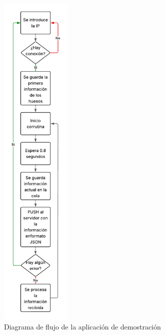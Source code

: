 \begin{figure}[H]
    \centering
    \includegraphics[width=0.3\textwidth]{Imagenes/Vectorial/FlujoAppFinal.pdf}
    \caption{Diagrama de flujo de la aplicación de demostración}
    \label{fig:Demo}
\end{figure}